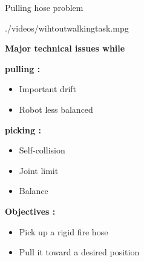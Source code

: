 

\begin{frame}{Pulling hose problem}
  \begin{minipage}{0.57\textwidth}
    \begin{center}
      {./videos/wihtoutwalkingtask.mpg}
    \end{center}
  \end{minipage}  \hfill
%
%
{
  \textbf{\color{txtcolor2} Major technical issues while }
  \begin{minipage}{0.28\textwidth}
    \textbf{\color{txtcolor2} pulling :}
    \begin{itemize}
      \item Important drift
      \item Robot less balanced
    \end{itemize}
    \vspace*{0.4cm}  
  \end{minipage}
%
  \begin{minipage}{0.25\textwidth}
    \textbf{\color{txtcolor2} picking :}
    \begin{itemize}
      \item Self-collision
      \item Joint limit
      \item Balance
    \end{itemize}
    \vspace*{0.4cm}
  \end{minipage}
}
%
{
  \begin{minipage}{0.39\textwidth}
    \textbf{\color{txtcolor2} Objectives :}
    \begin{itemize}
      \item Pick up a rigid fire hose
      \item Pull it toward a desired position
    \end{itemize}
    \vspace*{0.7cm}
  \end{minipage}
}
%
\end{frame}
 